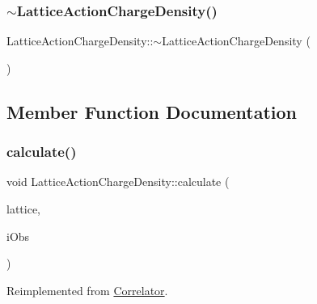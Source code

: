 \subsubsection{\texorpdfstring{$\sim$LatticeActionChargeDensity()}{~LatticeActionChargeDensity()}}
{\footnotesize\ttfamily Lattice\+Action\+Charge\+Density\+::$\sim$\+Lattice\+Action\+Charge\+Density (\begin{DoxyParamCaption}{ }\end{DoxyParamCaption})}



\subsection{Member Function Documentation}
\mbox{\label{class_lattice_action_charge_density_a3dddc75188042c645fbdd1c8b3e80c8a}} 
\subsubsection{\texorpdfstring{calculate()}{calculate()}}
{\footnotesize\ttfamily void Lattice\+Action\+Charge\+Density\+::calculate (\begin{DoxyParamCaption}\item[{\mbox{\hyperlink{class_lattice}{Lattice}}$<$ \mbox{\hyperlink{class_s_u3}{S\+U3}} $>$ $\ast$}]{lattice,  }\item[{unsigned int}]{i\+Obs }\end{DoxyParamCaption})\hspace{0.3cm}{\ttfamily [virtual]}}



Reimplemented from \mbox{\hyperlink{class_correlator_ab33502ff305f891c5c2e6d66a26a0247}{Correlator}}.

